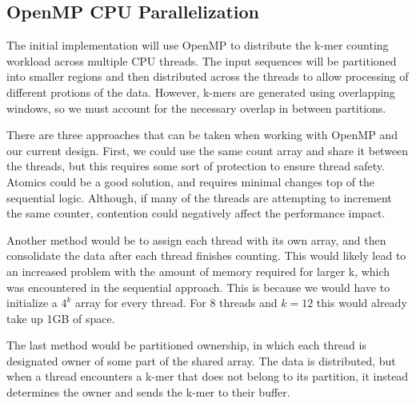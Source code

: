 \documentclass{article}
\begin{document}

\subsection{OpenMP CPU Parallelization}

\vspace{\baselineskip}

The initial implementation will use OpenMP to distribute the k-mer counting workload across multiple CPU threads. The input sequences will be partitioned 
into smaller regions and then distributed across the threads to allow processing of different protions of the data. However, k-mers are generated using 
overlapping windows, so we must account for the necessary overlap in between partitions. 

\vspace{\baselineskip}

There are three approaches that can be taken when working with OpenMP and our current design. First, we could use the same count array and 
share it between the threads, but this requires some sort of protection to ensure thread safety. Atomics could be a good solution, and requires 
minimal changes top of the sequential logic. Although, if many of the threads are attempting to increment the same counter, contention 
could negatively affect the performance impact. 

\vspace{\baselineskip}

Another method would be to assign each thread with its own array, and then consolidate the data after each thread finishes counting. This would 
likely lead to an increased problem with the amount of memory required for larger k, which was encountered in the sequential approach. This 
is because we would have to initialize a $4^k$ array for every thread. For 8 threads and $k=12$ this would already take up 1GB of space. 

\vspace{\baselineskip}

The last method would be partitioned ownership, in which each thread is designated owner of some part of the shared array. The data is distributed, but 
when a thread encounters a k-mer that does not belong to its partition, it instead determines the owner and sends the k-mer to their buffer. 

\vspace{\baselineskip}
\end{document}
